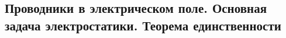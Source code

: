 \subsection{Проводники в электрическом поле. Основная задача электростатики. Теорема единственности}